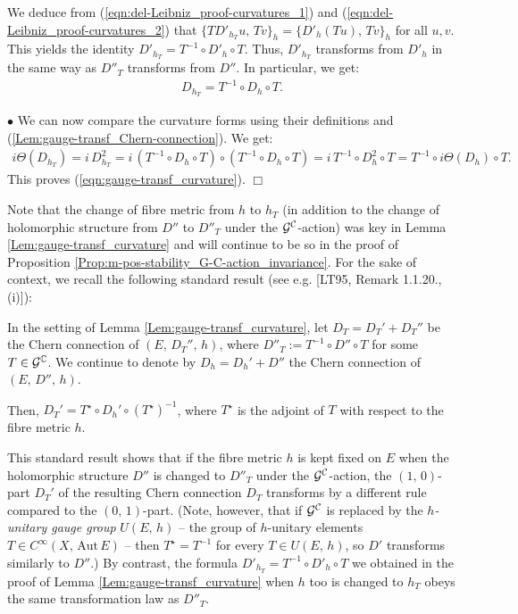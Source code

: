 \documentclass[12pt]{article}
\begin{document}
We deduce from (\ref{eqn:del-Leibniz_proof-curvatures_1}) and (\ref{eqn:del-Leibniz_proof-curvatures_2}) that $\{TD'_{h_T}u,\,Tv\}_h = \{D'_h(Tu),\,Tv\}_h$ for all $u,v$. This yields the identity $D'_{h_T} = T^{-1}\circ D'_h\circ T$. Thus, $D'_{h_T}$ transforms from $D'_h$ in the same way as $D''_T$ transforms from $D''$. In particular, we get: \begin{eqnarray}\label{Lem:gauge-transf_Chern-connection}D_{h_T} = T^{-1}\circ D_h\circ T.\end{eqnarray} 
  
$\bullet$ We can now compare the curvature forms using their definitions and (\ref{Lem:gauge-transf_Chern-connection}). We get: \begin{eqnarray*}i\Theta(D_{h_T}) = i\,D_{h_T}^2 = i\,(T^{-1}\circ D_h\circ T)\circ(T^{-1}\circ D_h\circ T) = i\,T^{-1}\circ D_h^2\circ T = T^{-1}\circ i\Theta(D_h)\circ T.  \end{eqnarray*} This proves (\ref{eqn:gauge-transf_curvature}).  \hfill $\Box$

\vspace{1ex}

Note that the change of fibre metric from $h$ to $h_T$ (in addition to the change of holomorphic structure from $D''$ to $D''_T$ under the ${\cal G}^{\cal C}$-action) was key in Lemma \ref{Lem:gauge-transf_curvature} and will continue to be so in the proof of Proposition \ref{Prop:m-pos-stability_G-C-action_invariance}. For the sake of context, we recall the following standard result (see e.g. [LT95, Remark 1.1.20., (i)]):

\begin{Prop}\label{Prop:D'_T_D'_same-metric} In the setting of Lemma \ref{Lem:gauge-transf_curvature}, let $D_T = D_T' + D_T''$ be the Chern connection of $(E,\,D_T'',\,h)$, where $D''_T:=T^{-1}\circ D''\circ T$ for some $T\in{\cal G}^{\mathbb{C}}$. We continue to denote by $D_h=D_h' + D''$ the Chern connection of $(E,\,D'',\,h)$.

  Then, $D_T' = T^\star\circ D_h'\circ(T^\star)^{-1}$, where $T^\star$ is the adjoint of $T$ with respect to the fibre metric $h$.


\end{Prop}


\vspace{1ex}

This standard result shows that if the fibre metric $h$ is kept fixed on $E$ when the holomorphic structure $D''$ is changed to $D''_T$ under the ${\cal G}^{\cal C}$-action, the $(1,\,0)$-part $D_T'$ of the resulting Chern connection $D_T$ transforms by a different rule compared to the $(0,\,1)$-part. (Note, however, that if ${\cal G}^{\cal C}$ is replaced by the {\it $h$-unitary gauge group} $U(E,\,h)$ -- the group of $h$-unitary elements $T\in C^\infty(X,\,\mbox{Aut}\,E)$ -- then $T^\star = T^{-1}$ for every $T\in U(E,\,h)$, so $D'$ transforms similarly to $D''$.) By contrast, the formula $D'_{h_T} = T^{-1}\circ D'_h\circ T$ we obtained in the proof of Lemma \ref{Lem:gauge-transf_curvature} when $h$ too is changed to $h_T$ obeys the same transformation law as $D''_T$. 
\end{document}
